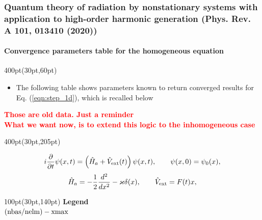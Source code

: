 \begin{frame}
\frametitle{Quantum theory of radiation by nonstationary systems 
	with application to high-order harmonic generation
        (Phys. Rev. A 101, 013410 (2020))}
	\framesubtitle{Convergence parameters table for 
             the homogeneous equation}
\small

\begin{textblock*}{400pt}(30pt,60pt)
\footnotesize
\begin{itemize}
\item The following table shows parameters known to return converged results 
for Eq. (\ref{eqn:step_1d}), which is recalled below
\end{itemize}
	\textcolor{red}{\textbf{Those are old data. Just a reminder}}\\
	\textcolor{red}{\textbf{What we want now, 
	is to extend this logic to the inhomogeneous case}}

\end{textblock*}

\vspace{20pt}

{
\tiny 


}


\begin{textblock*}{400pt}(30pt,205pt)
\scriptsize

\begin{equation}
	i\frac{\partial}{\partial t}\psi(x,t)
	   = \left( \hat{H}_a + \hat{V}_{\rm ext}(t)\right) 
	   \psi(x,t),   \hspace{20pt}\psi(x,0)=\psi_0(x), \nonumber
\end{equation}
\begin{equation}
  \hat{H}_a = -\frac{1}{2}\frac{d^2}{dx^2} - \varkappa\delta(x), \hspace{20pt}
  \hat{V}_{\rm ext} = F(t)x,   \nonumber
\end{equation}

\end{textblock*}


\begin{textblock*}{100pt}(30pt,140pt)
\scriptsize
\textbf{Legend} \\
$\rm (nbas/nelm) - xmax $


\end{textblock*}

\end{frame}

